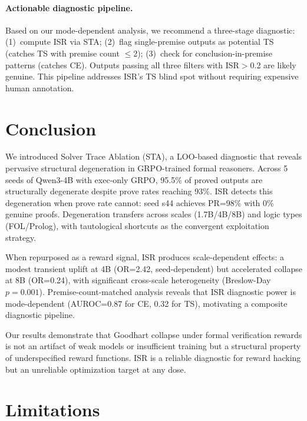 \documentclass[11pt,a4paper]{article}
\begin{document}
\paragraph{Actionable diagnostic pipeline.}
Based on our mode-dependent analysis, we recommend a three-stage diagnostic:
(1)~compute ISR via STA;
(2)~flag single-premise outputs as potential TS (catches TS with premise count $\leq$2);
(3)~check for conclusion-in-premise patterns (catches CE).
Outputs passing all three filters with ISR$>$0.2 are likely genuine.
This pipeline addresses ISR's TS blind spot without requiring expensive human annotation.

\section{Conclusion}

We introduced Solver Trace Ablation (STA), a LOO-based diagnostic that reveals pervasive structural degeneration in GRPO-trained formal reasoners.
Across 5 seeds of Qwen3-4B with exec-only GRPO, 95.5\% of proved outputs are structurally degenerate despite prove rates reaching 93\%.
ISR detects this degeneration when prove rate cannot: seed s44 achieves PR=98\% with 0\% genuine proofs.
Degeneration transfers across scales (1.7B/4B/8B) and logic types (FOL/Prolog), with tautological shortcuts as the convergent exploitation strategy.

When repurposed as a reward signal, ISR produces scale-dependent effects: a modest transient uplift at 4B (OR=2.42, seed-dependent) but accelerated collapse at 8B (OR=0.24), with significant cross-scale heterogeneity (Breslow-Day $p=0.001$).
Premise-count-matched analysis reveals that ISR diagnostic power is mode-dependent (AUROC=0.87 for CE, 0.32 for TS), motivating a composite diagnostic pipeline.

Our results demonstrate that Goodhart collapse under formal verification rewards is not an artifact of weak models or insufficient training but a structural property of underspecified reward functions.
ISR is a reliable diagnostic for reward hacking but an unreliable optimization target at any dose.

\section*{Limitations}
\end{document}
